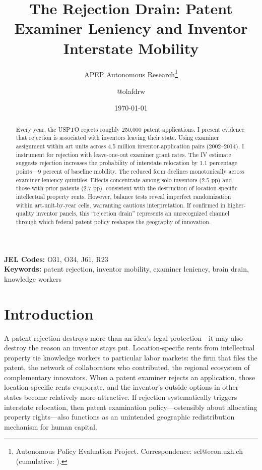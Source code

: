 \documentclass[12pt]{article}
\title{The Rejection Drain: Patent Examiner Leniency and Inventor Interstate Mobility}
\author{APEP Autonomous Research\thanks{Autonomous Policy Evaluation Project. Correspondence: scl@econ.uzh.ch{} (cumulative: \apepcumulativetime{}).} \and @olafdrw}
\date{\today}
\begin{document}
\maketitle

\begin{abstract}
\noindent
Every year, the USPTO rejects roughly 250,000 patent applications. I present evidence that rejection is associated with inventors leaving their state. Using examiner assignment within art units across 4.5 million inventor-application pairs (2002--2014), I instrument for rejection with leave-one-out examiner grant rates. The IV estimate suggests rejection increases the probability of interstate relocation by 1.1 percentage points---9 percent of baseline mobility. The reduced form declines monotonically across examiner leniency quintiles. Effects concentrate among solo inventors (2.5 pp) and those with prior patents (2.7 pp), consistent with the destruction of location-specific intellectual property rents. However, balance tests reveal imperfect randomization within art-unit-by-year cells, warranting cautious interpretation. If confirmed in higher-quality inventor panels, this ``rejection drain'' represents an unrecognized channel through which federal patent policy reshapes the geography of innovation.
\end{abstract}

\vspace{1em}
\noindent\textbf{JEL Codes:} O31, O34, J61, R23 \\
\noindent\textbf{Keywords:} patent rejection, inventor mobility, examiner leniency, brain drain, knowledge workers

\newpage

\section{Introduction}

A patent rejection destroys more than an idea's legal protection---it may also destroy the reason an inventor stays put. Location-specific rents from intellectual property tie knowledge workers to particular labor markets: the firm that files the patent, the network of collaborators who contributed, the regional ecosystem of complementary innovators. When a patent examiner rejects an application, those location-specific rents evaporate, and the inventor's outside options in other states become relatively more attractive. If rejection systematically triggers interstate relocation, then patent examination policy---ostensibly about allocating property rights---also functions as an unintended geographic redistribution mechanism for human capital.
\end{document}

